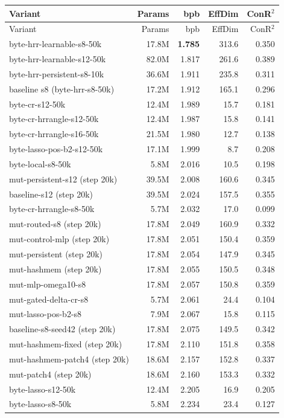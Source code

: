\documentclass[11pt,openany]{book}
\begin{document}
\begin{longtable}{lrrrr}
\toprule
Variant & Params & bpb & EffDim & ConR$^2$ \\
\midrule
\endfirsthead
\toprule
Variant & Params & bpb & EffDim & ConR$^2$ \\
\midrule
\endhead
byte-hrr-learnable-s8-50k & 17.8M & \textbf{1.785} & 313.6 & 0.350 \\
byte-hrr-learnable-s12-50k & 82.0M & 1.817 & 261.6 & 0.389 \\
byte-hrr-persistent-s8-10k & 36.6M & 1.911 & 235.8 & 0.311 \\
baseline s8 (byte-hrr-s8-50k) & 17.2M & 1.912 & 165.1 & 0.296 \\
byte-cr-s12-50k & 12.4M & 1.989 & 15.7 & 0.181 \\
byte-cr-hrrangle-s12-50k & 12.4M & 1.987 & 15.8 & 0.141 \\
byte-cr-hrrangle-s16-50k & 21.5M & 1.980 & 12.7 & 0.138 \\
byte-lasso-pos-b2-s12-50k & 17.1M & 1.999 & 8.7 & 0.208 \\
byte-local-s8-50k & 5.8M & 2.016 & 10.5 & 0.198 \\
mut-persistent-s12 (step 20k) & 39.5M & 2.008 & 160.6 & 0.345 \\
baseline-s12 (step 20k) & 39.5M & 2.024 & 157.5 & 0.355 \\
byte-cr-hrrangle-s8-50k & 5.7M & 2.032 & 17.0 & 0.099 \\
mut-routed-s8 (step 20k) & 17.8M & 2.049 & 160.9 & 0.332 \\
mut-control-mlp (step 20k) & 17.8M & 2.051 & 150.4 & 0.359 \\
mut-persistent (step 20k) & 17.8M & 2.054 & 147.9 & 0.345 \\
mut-hashmem (step 20k) & 17.8M & 2.055 & 150.5 & 0.348 \\
mut-mlp-omega10-s8 & 17.8M & 2.057 & 150.8 & 0.359 \\
mut-gated-delta-cr-s8 & 5.7M & 2.061 & 24.4 & 0.104 \\
mut-lasso-pos-b2-s8 & 7.9M & 2.067 & 15.8 & 0.115 \\
baseline-s8-seed42 (step 20k) & 17.8M & 2.075 & 149.5 & 0.342 \\
mut-hashmem-fixed (step 20k) & 17.8M & 2.110 & 151.8 & 0.358 \\
mut-hashmem-patch4 (step 20k) & 18.6M & 2.157 & 152.8 & 0.337 \\
mut-patch4 (step 20k) & 18.6M & 2.160 & 153.3 & 0.332 \\
byte-lasso-s12-50k & 12.4M & 2.205 & 16.9 & 0.205 \\
byte-lasso-s8-50k & 5.8M & 2.234 & 23.4 & 0.127 \\
\bottomrule
\end{longtable}
\end{document}
